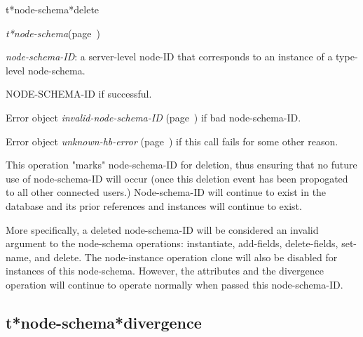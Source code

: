 \begin{description}
\item [Name:]  t*node-schema*delete

\item [Class:] {\sl t*node-schema}\hfill(page~\pageref{t*node-schema})

\item [Parameters:]
\item {\sl node-schema-ID}:  a server-level node-ID that corresponds to an 
instance of a type-level node-schema. 



\item [Return-value:]
NODE-SCHEMA-ID if successful. 

Error object {\sl invalid-node-schema-ID} (page~\pageref{invalid-node-schema-ID}) if bad 
node-schema-ID. 

Error object {\sl unknown-hb-error} (page~\pageref{unknown-hb-error}) if this call
fails for some other reason.

\item [Description:]

This operation "marks" node-schema-ID for deletion, 
thus ensuring that no future use of node-schema-ID 
will occur (once this deletion event has been propogated
to all other connected users.)  Node-schema-ID will
continue to exist in the database and its prior 
references and instances will continue to exist. 

More specifically, a deleted node-schema-ID will be
considered an invalid argument to the node-schema
operations: instantiate, add-fields, delete-fields,
set-name, and delete. The node-instance operation clone
will also be disabled for instances of this node-schema.
However, the attributes and the divergence operation will
continue to operate normally when passed this
node-schema-ID.

\item [Public:]



\end{description}
\horizontalline

\subsection{t*node-schema*divergence}
\label{t*node-schema*divergence}


